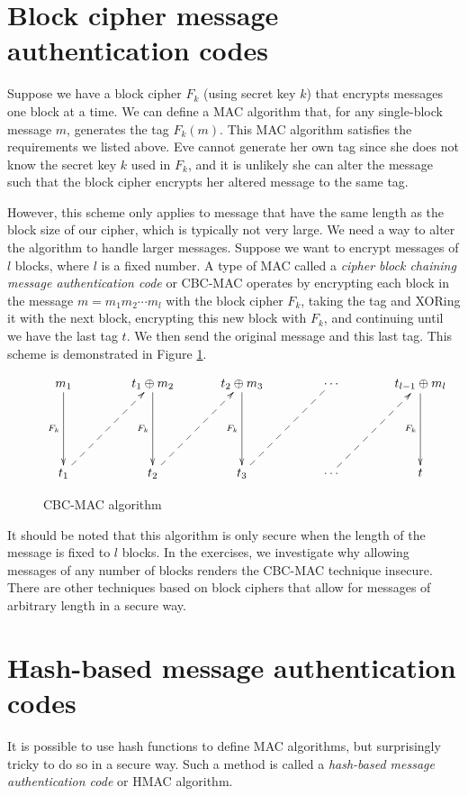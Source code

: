 \documentclass{book}
\theoremstyle{plain}
\theoremstyle{definition}
\begin{document}
\section{Block cipher message authentication codes}
Suppose we have a block cipher $F_k$ (using secret key $k$) that encrypts messages one block at a time. We can define a MAC algorithm that, for any single-block message $m$, generates the tag $F_k(m)$. This MAC algorithm satisfies the requirements we listed above. Eve cannot generate her own tag since she does not know the secret key $k$ used in $F_k$, and it is unlikely she can alter the message such that the block cipher encrypts her altered message to the same tag.

However, this scheme only applies to message that have the same length as the block size of our cipher, which is typically not very large. We need a way to alter the algorithm to handle larger messages. Suppose we want to encrypt messages of $l$ blocks, where $l$ is a fixed number. A type of MAC called a {\it cipher block chaining message authentication code} or CBC-MAC operates by encrypting each block in the message $m = m_1m_2 \cdots m_l$ with the block cipher $F_k$, taking the tag and XORing it with the next block, encrypting this new block with $F_k$, and continuing until we have the last tag $t$. We then send the original message and this last tag. This scheme is demonstrated in Figure \ref{fig:cbc-mac}.

\begin{figure}[h]
\begin{center}
$$\xymatrix@!{
m_1 \ar[d]_{F_k} & t_1 \oplus m_2 \ar[d]_{F_k} & t_2 \oplus m_3 \ar[d]_{F_k} & \cdots & t_{l-1} \oplus m_l \ar[d]_{F_k} \\
t_1 \ar@{-->}[ur] & t_2 \ar@{-->}[ur] & t_3 \ar@{--}[ur] & \cdots \ar@{-->}[ur] & t
}$$
\caption{CBC-MAC algorithm}
\label{fig:cbc-mac}
\end{center}
\end{figure}

It should be noted that this algorithm is only secure when the length of the message is fixed to $l$ blocks. In the exercises, we investigate why allowing messages of any number of blocks renders the CBC-MAC technique insecure. There are other techniques based on block ciphers that allow for messages of arbitrary length in a secure way.

\section{Hash-based message authentication codes}
It is possible to use hash functions to define MAC algorithms, but surprisingly tricky to do so in a secure way. Such a method is called a {\it hash-based message authentication code} or HMAC algorithm.
\end{document}
